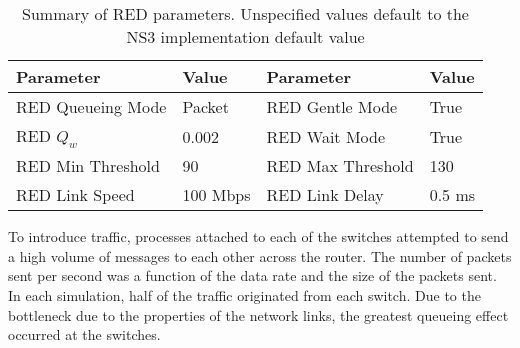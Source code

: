 \begin{table}
\begin{center}
\begin{tabular}{ | l | l || l | l | } \hline
Parameter & Value & Parameter & Value        \\ \hline
RED Queueing Mode & Packet & RED Gentle Mode & True    \\ \hline
RED $Q_{w}$ & 0.002 & RED Wait Mode & True      \\ \hline
RED Min Threshold & 90 & RED Max Threshold & 130   \\ \hline
RED Link Speed & 100 Mbps & RED Link Delay & 0.5 ms   \\ \hline
\end{tabular}
\end{center}
\caption{Summary of \ac{RED} parameters. Unspecified values default to the \ac{NS3} implementation default value}
\label{tab:red-parameters}
\end{table}

To introduce traffic, processes attached to each of the switches attempted to send a high volume of messages to each other across the router.
The number of packets sent per second was a function of the data rate and the size of the packets sent.
In each simulation, half of the traffic originated from each switch.
Due to the bottleneck due to the properties of the network links, the greatest queueing effect occurred at the switches.
